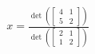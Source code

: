 \documentclass[preview]{standalone}
\begin{document}
\begin{align*}
x = \frac{\det\left(\begin{bmatrix} 4 & 1 \\ 5 & 2 \end{bmatrix}\right)}{\det\left(\begin{bmatrix} 2 & 1 \\ 1 & 2 \end{bmatrix}\right)}
\end{align*}
\end{document}
